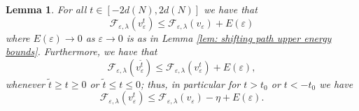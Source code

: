 \documentclass[11pt]{article}
\newtheorem{lem}{Lemma}
\begin{document}
\begin{lem}\label{lem: sliding path upper energy bounds}
For all $t \in [-2d(N),2d(N)]$ we have that
\begin{equation*}
    \mathcal{F}_{\varepsilon,\lambda}(v^t_\varepsilon) \leq \mathcal{F}_{\varepsilon,\lambda}(v_\varepsilon) + E(\varepsilon)
\end{equation*}
where $E(\varepsilon) \rightarrow 0$ as $\varepsilon \rightarrow 0$ is as in Lemma \ref{lem: shifting path upper energy bounds}. Furthermore, we have that
\begin{equation*}
    \mathcal{F}_{\varepsilon,\lambda}(v^{ \tilde{t}}_\varepsilon) \leq \mathcal{F}_{\varepsilon,\lambda}(v^{ t}_\varepsilon)+ E(\varepsilon),
\end{equation*}
whenever $\tilde{t} \geq t \geq 0$ or $\tilde{t} \leq t \leq 0$; thus, in particular for $t > t_0$ or $t < -t_0$ we have
\begin{equation*}
   \mathcal{F}_{\varepsilon,\lambda}(v^{ t}_\varepsilon)  \leq \mathcal{F}_{\varepsilon,\lambda}(v_\varepsilon) - \eta + E(\varepsilon).
\end{equation*}
\end{lem}
\end{document}
